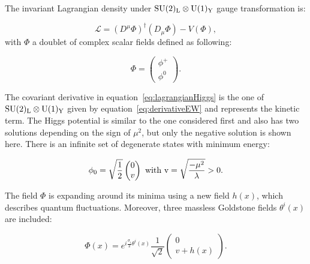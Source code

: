       The invariant Lagrangian density under $\rm{SU}(2)_{\rm{L}} \otimes \rm{U}(1)_{\rm{Y}}$ gauge transformation is:

      \begin{equation}
        \mathcal{L} = \left(D^{\mu} \Phi \right)^{\dagger} \left( D_{\mu} \Phi \right) - V(\Phi),
        \label{eq:lagrangianHiggs}
      \end{equation}    
      with $\Phi$ a doublet of complex scalar fields defined as following:
      
      \begin{equation}
         \Phi = \begin{pmatrix}
                  \phi^{+}\\
                  \phi^{0}
                \end{pmatrix}.
      \end{equation}

      The covariant derivative in equation~\ref{eq:lagrangianHiggs} is the one of $\rm{SU}(2)_{\rm{L}} \otimes \rm{U}(1)_{\rm{Y}}$ given by equation~\ref{eq:derivativeEW} and represents the kinetic term.
      The Higgs potential is similar to the one considered first and also has two solutions depending on the sign of $\mu^2$, but only the negative solution is shown here.
      There is an infinite set of degenerate states with minimum energy:

      \begin{equation}
        \phi_0 = \sqrt{\frac{1}{2}}
        \begin{pmatrix}
          0 \\
          v
        \end{pmatrix}
        ~\rm{with}~v = \sqrt{\frac{- \mu^2}{\lambda}} > 0.
        \label{eq:v2}
      \end{equation}
      
      The field $\Phi$ is expanding around its minima using a new field $h(x)$, which describes quantum fluctuations.
      Moreover, three massless Goldstone fields $\theta^{i}(x)$ are included:

      \begin{equation}
        \Phi(x) = e^{i\frac{\sigma_i}{2}\theta^i(x)} \frac{1}{\sqrt{2}}
                  \begin{pmatrix}
                     0 \\
                     v + h(x)
                   \end{pmatrix}.
        \label{eq:fieldHiggs}
      \end{equation}
       
